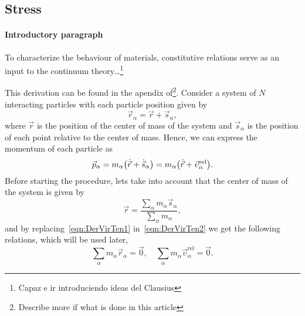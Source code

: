 \documentclass[../../main-notes.tex]{subfiles}
\begin{document}
\subsection{Stress}

\paragraph{Introductory paragraph} To characterize the behaviour of materials, constitutive relations serve as an input to the continuum theory\dots\footnote{Capaz e ir introduciendo ideas del Clausius\citep{clausiusXVIMechanicalTheorem1870}}

This derivation can be found in the apendix of\citep{admalUnifiedInterpretationStress2010}\footnote{Describe more if what is done in this article}.
Consider a system of $N$ interacting particles with each particle position given by
\begin{equation}
    \vec{r}_{\alpha} = \vec{r} + \vec{s}_{\alpha}\label{eqn:DerVirTen1},
\end{equation}
where $\vec{r}$ is the position of the center of mass of the system and $\vec{s}_\alpha$ is the position of each point relative to the center of mass.
Hence, we can express the momentum of each particle as
\begin{equation}
    \vec{p}_\alpha = m_\alpha\qty(\dot{\vec{r}}+\dot{\vec{s}}_\alpha) = m_\alpha\qty(\dot{\vec{r}}+\vec{\upsilon}_\alpha^{\mathrm{rel}}).\label{eqn:DerVirTen2}
\end{equation}
Before starting the procedure, lets take into account that the center of mass of the system is given by
\begin{equation}
    \vec{r} = \frac{\sum_{\alpha}m_\alpha\vec{s}_\alpha}{\sum_{\alpha}m_\alpha}\label{eqn:DerVirTen3},
\end{equation}
and by replacing~\eqref{eqn:DerVirTen1} in~\eqref{eqn:DerVirTen2} we get the following relations, which will be used later,
\begin{equation}
    \sum_\alpha m_\alpha\vec{r}_\alpha = \vec{0},\quad
    \sum_\alpha m_\alpha\vec{\upsilon}_\alpha^{\mathrm{rel}} = \vec{0}.\label{eqn:DerVirTen4}
\end{equation}
\end{document}
